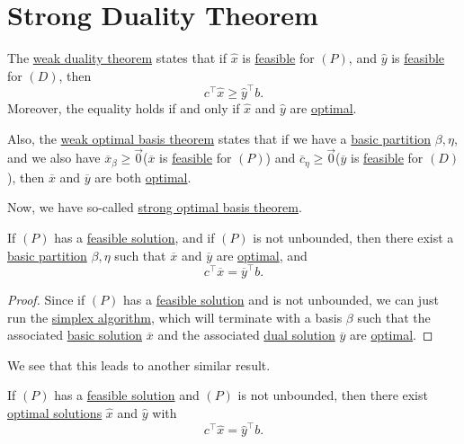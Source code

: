 \section{Strong Duality Theorem}
\begin{prev}
	The \hyperref[thm:weak-duality-theorem]{weak duality theorem} states that if \(\hat{x}\) is \hyperref[def:feasible-solution]{feasible} for \((P)\), and \(\hat{y}\)
	is \hyperref[def:feasible-solution]{feasible} for \((D)\), then
	\[
		c^{\top} \hat{x} \geq  \hat{y}^{\top} b.
	\]
	Moreover, the equality holds if and only if \(\hat{x}\) and \(\hat{y}\) are \hyperref[def:optimal-solution]{optimal}.

	Also, the \hyperref[thm:weak-optimal-basis-theorem]{weak optimal basis theorem} states that if we have a \hyperref[def:basic-partition]{basic partition} \(\beta, \eta\),
	and we also have \(\overline{x}_{\beta}\geq \vec{0}\)(\(\overline{x}\) is \hyperref[def:feasible-solution]{feasible} for \((P)\)) and
	\(\overline{c}_{\eta} \geq \vec{0}\)(\(\overline{y}\) is \hyperref[def:feasible-solution]{feasible} for \((D)\)), then \(\overline{x}\) and \(\overline{y}\)
	are both \hyperref[def:optimal-solution]{optimal}.
\end{prev}

Now, we have so-called \hyperref[thm:strong-optimal-basis-theorem]{strong optimal basis theorem}.
\begin{theorem}\label{thm:strong-optimal-basis-theorem}
	If \((P)\) has a \hyperref[def:feasible-solution]{feasible solution}, and if \((P)\) is not unbounded, then there exist a \hyperref[def:basic-partition]{basic partition}
	\(\beta, \eta\) such that \(\overline{x}\) and \(\overline{y}\) are \hyperref[def:optimal-solution]{optimal}, and
	\[
		c^{\top} \overline{x} = \overline{y}^{\top} b.
	\]
\end{theorem}
\begin{proof}
	Since if \((P)\) has a \hyperref[def:feasible-solution]{feasible solution} and is not unbounded, we can just run the \hyperref[algo:simplex-algorithm]{simplex algorithm},
	which will terminate with a basis \(\beta\) such that the associated \hyperref[def:basic-solution]{basic solution} \(\overline{x}\) and the associated
	\hyperref[def:dual-basic-solution]{dual solution} \(\overline{y}\) are \hyperref[def:optimal-solution]{optimal}.
\end{proof}

We see that this leads to another similar result.
\begin{theorem}\label{thm:strong-duality-theorem}
	If \((P)\) has a \hyperref[def:feasible-solution]{feasible solution} and \((P)\) is not unbounded, then there exist \hyperref[def:optimal-solution]{optimal solutions}
	\(\hat{x}\) and \(\hat{y}\) with
	\[
		c^{\top} \hat{x} = \hat{y}^{\top} b.
	\]
\end{theorem}

